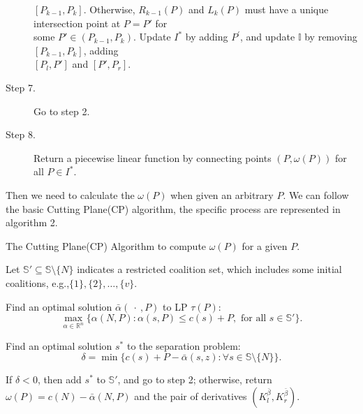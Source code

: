 \begin{algorithm}[h]
\begin{algorithmic}[1]
\begin{description}
  $[P_{k-1},P_{k}]$. Otherwise, $R_{k-1}(P)$ and $L_{k}(P)$ must have a unique intersection point at $P=P'$ for  \\
  \vspace{10pt}
  some $P' \in (P_{k-1},P_{k})$.
  Update $I^*$ by adding $P^'$, and update $\mathbb{I}$ by removing $[P_{k-1},P_{k}]$, adding \\
  \vspace{10pt}
  $[P_l,P']$ and $[P',P_r]$.
  \item[Step 7.] Go to step 2.
  \item[Step 8.] Return a piecewise linear function by connecting points $(P,\omega(P))$ for all $P \in I^*$.

\end{description}

\end{algorithmic}
\end{algorithm}

Then we need to calculate the $\omega(P)$ when given an arbitrary $P$. We can follow the basic Cutting Plane(CP) algorithm, the specific process are represented in algorithm 2.

\begin{algorithm}[h]\label{algoCP}
\caption{The Cutting Plane(CP) Algorithm to compute $\omega(P)$ for a given $P$.}
\begin{algorithmic}[1]

\begin{description}
  \justifying
  \item[Step 1.] Let $\mathbb{S}'\subseteq \mathbb{S}\setminus \{N\}$ indicates a restricted coalition set, which includes some initial coalitions,
  \vspace{10pt}
  e.g.,$ \{1\},\{2\},\ldots,\{v\}$.
  \item[Step 2.] Find an optimal solution $\bar{\alpha}(\ \cdot \ ,P)$ to LP $\tau(P)$:
  \begin{equation*}
  \max_{\alpha\in \mathbb{R}^n} \big\{ \alpha(N,P): \alpha(s,P) \leq c(s)+P, \mbox{ for all } s \in \mathbb{S}'\big\}.
  \end{equation*}
  \vspace{-11pt}
  \item[Step 3.]
  Find an optimal solution $s^*$ to the separation problem:
  \begin{equation*}
  \delta = \min \big\{ c(s)+ P -\bar{\alpha}(s,z): \forall s \in \mathbb{S} \setminus \{N\}\big\}.
  \end{equation*}
  \item[Step 4.]
  If $\delta<0$, then add $s^*$ to $\mathbb{S}'$, and go to step 2; otherwise, return $\omega(P)=c(N)-\bar{\alpha}(N,P)$ and the pair of derivatives $(K_{l}^{\bar{\beta}},K_{r}^{\bar{\beta}})$.
\end{description}

\end{algorithmic}
\end{algorithm}

